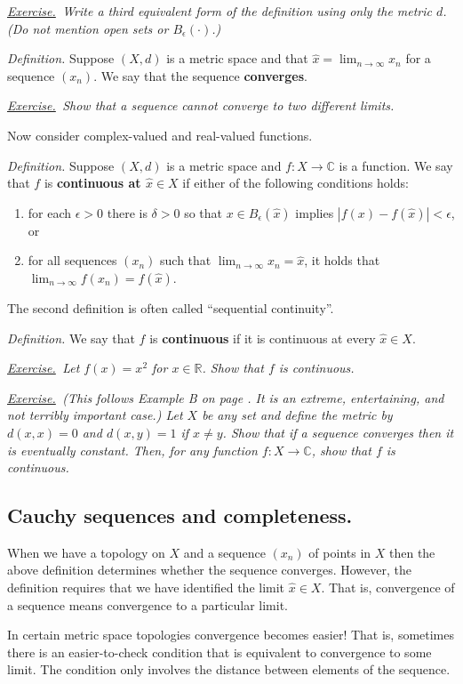 \documentclass[12pt]{article}
\newcommand{\CC}{\mathbb{C}}
\newcommand{\RR}{\mathbb{R}}
\newcommand{\eps}{\epsilon}
\newcommand{\ds}{\displaystyle}
\newcommand{\sect}[1]{\subsection*{#1.}}
\newcommand{\defin}{\emph{Definition.}\,\,}
\newcommand{\exer}[2]{\emph{\underline{Exercise.}\, #2} \vspace*{#1mm}}
\begin{document}
\exer{30}{Write a third equivalent form of the definition using only the metric $d$.  (Do not mention open sets or $B_\eps(\cdot)$.)}

\defin Suppose $(X,d)$ is a metric space and that $\ds \hat x = \lim_{n\to\infty} x_n$ for a sequence $(x_n)$.  We say that the sequence \textbf{converges}.

\exer{40}{Show that a sequence cannot converge to two different limits.}

Now consider complex-valued and real-valued functions.

\defin Suppose $(X,d)$ is a metric space and $f:X\to \CC$ is a function.  We say that $f$ is \textbf{continuous at $\hat x\in X$} if either of the following conditions holds:
\begin{enumerate}
\item for each $\eps>0$ there is $\delta>0$ so that $x \in B_\eps(\hat x)$ implies $|f(x)-f(\hat x)| < \eps$, or
\item for all sequences $(x_n)$ such that $\displaystyle \lim_{n\to\infty} x_n = \hat x$, it holds that $\displaystyle \lim_{n\to\infty} f(x_n) = f(\hat x)$.
\end{enumerate}

The second definition is often called ``sequential continuity''.

\defin We say that $f$ is \textbf{continuous} if it is continuous at every $\hat x\in X$.

\exer{20}{Let $f(x)=x^2$ for $x\in \RR$.  Show that $f$ is continuous.}

\clearpage\newpage
\phantom{foo}
\vspace{20mm}

\exer{40}{(\emph{This follows Example B on page \pageref{topic:metric}.  It is an extreme, entertaining, and not terribly important case.})  Let $X$ be any set and define the metric by $d(x,x)=0$ and $d(x,y)=1$ if $x\ne y$.  Show that if a sequence converges then it is eventually constant.  Then, for \emph{any} function $f:X\to\CC$, show that $f$ is continuous.}


\sect{Cauchy sequences and completeness}

When we have a topology on $X$ and a sequence $(x_n)$ of points in $X$ then the above definition determines whether the sequence converges.  However, the definition requires that we have identified the limit $\hat x \in X$.  That is, convergence of a sequence means convergence to a particular limit.

In certain metric space topologies convergence becomes easier!  That is, sometimes there is an easier-to-check condition that is equivalent to convergence to some limit.  The condition only involves the distance between elements of the sequence.
\end{document}
